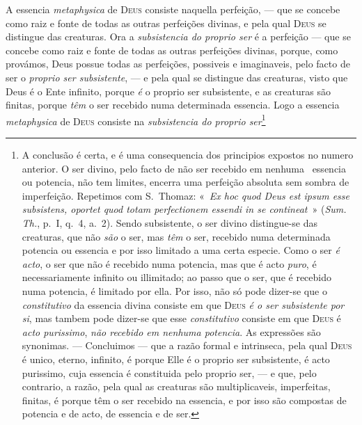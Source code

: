  A
essencia \emph{metaphysica} de \textsc{Deus} consiste naquella perfeição, --- que se
concebe como raiz e fonte de todas as outras perfeições divinas, e pela qual \textsc{Deus}
se distingue das creaturas. Ora a \emph{subsistencia do proprio ser} é a
perfeição --- que se concebe como raiz e fonte de todas as outras
perfeições divinas, porque, como provámos, Deus possue todas as perfeições, possiveis e
imaginaveis, pelo facto de ser o \emph{proprio ser subsistente}, --- e pela qual se
distingue das creaturas, visto que Deus é o Ente infinito, porque \emph{é} o proprio ser
subsistente, e as creaturas são finitas, porque \emph{têm} o ser recebido numa
determinada essencia. Logo a essencia \emph{metaphysica} de \textsc{Deus} consiste na
\emph{subsistencia do proprio ser}\footnote{A conclusão é certa, e é uma consequencia dos
principios expostos no numero anterior. O ser divino, pelo facto de não ser recebido em
nenhuma ~essencia ou potencia, não tem limites, encerra uma perfeição absoluta sem
sombra de imperfeição. Repetimos com S.~Thomaz: «~\emph{Ex hoc quod Deus est ipsum esse
subsistens, oportet quod totam perfectionem essendi in se contineat}~» (\emph{Sum. Th.},
p.~I, q.~4, a.~2). Sendo subsistente, o ser divino distingue-se das creaturas, que não
\emph{são} o ser, mas \emph{têm} o ser, recebido numa determinada potencia ou essencia e
por isso limitado a uma certa especie. Como o ser \emph{é acto}, o ser que não é recebido
numa potencia, mas que é acto \emph{puro}, é necessariamente infinito ou illimitado; ao
passo que o ser, que é recebido numa potencia, é limitado por ella. Por isso, não só pode
dizer-se que o \emph{constitutivo} da essencia divina consiste em que \textsc{Deus}
\emph{é o ser subsistente por si}, mas tambem pode dizer-se que esse \emph{constitutivo}
consiste em que \textsc{Deus} é \emph{acto purissimo}, \emph{não recebido em nenhuma
potencia}. As expressões são synonimas. --- Concluimos --- que a razão formal e
intrinseca, pela qual \textsc{Deus} é unico, eterno, infinito, é porque Elle é o proprio
ser subsistente, é acto purissimo, cuja essencia é constituida pelo proprio ser, --- e
que, pelo contrario, a razão, pela qual as creaturas são multiplicaveis, imperfeitas,
finitas, é porque têm o ser recebido na essencia, e por isso são compostas de potencia e
de acto, de essencia e de ser.

}
